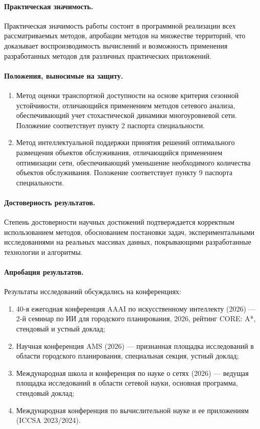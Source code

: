 \paragraph*{Практическая значимость.}
Практическая значимость работы состоит в программной реализации всех рассматриваемых методов, апробации методов на множестве территорий, что доказывает воспроизводимость вычислений и возможность применения разработанных методов для различных практических приложений.

\paragraph*{Положения, выносимые на защиту.}
\begin{enumerate}
    \item Метод оценки транспортной доступности на основе критерия сезонной устойчивости, отличающийся применением методов сетевого анализа, обеспечивающий учет стохастической динамики многоуровневой сети. Положение соответствует пункту 2 паспорта специальности.

    \item Метод интеллектуальной поддержки принятия решений оптимального размещения объектов обслуживания, отличающийся применением оптимизации сети, обеспечивающий уменьшение необходимого количества объектов обслуживания. Положение соответствует пункту 9 паспорта специальности.
\end{enumerate}

\paragraph*{Достоверность результатов.}
Степень достоверности научных достижений
подтверждается корректным использованием методов, обоснованием постановки задач, экспериментальными исследованиями на реальных массивах данных, покрывающими разработанные технологии и алгоритмы.

\paragraph*{Апробация результатов.}
Результаты исследований обсуждались на конференциях:​

\begin{enumerate}
	\item 40-я ежегодная конференция AAAI по искусственному интеллекту (2026) --- 2-й семинар по ИИ для городского планирования, 2026, рейтинг CORE: A*, стендовый и устный доклад;
	\item Научная конференция AMS (2026) --- признанная площадка исследований в области городского планирования, специальная секция, устный доклад;
	\item Международная школа и конференция по науке о сетях (2026) --- ведущая площадка исследований в области сетевой науки, основная программа, стендовый доклад;
	\item Международная конференция по вычислительной науке и ее приложениям (ICCSA 2023/2024).
\end{enumerate}

